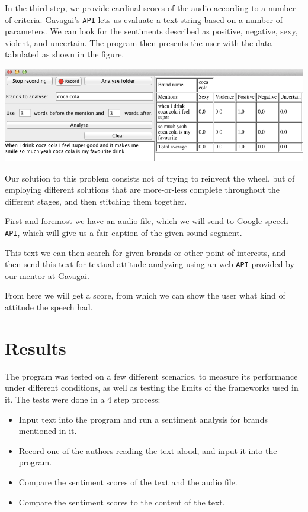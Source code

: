 \documentclass[a4paper,12pt,twoside]{ltxdoc}
\begin{document}
In the third step, we provide cardinal scores of the audio according to a number of criteria. Gavagai's \verb#API# lets us
evaluate a text string based on a number of parameters. We can look for the sentiments described as positive, negative, sexy, violent,
and uncertain. The program then presents the user with the data tabulated as shown in the figure. %

\begin{center}
\includegraphics[scale=0.6]{../poster/screenshot_crop.png}
\end{center}

Our solution to this problem consists not of trying to reinvent the wheel, but of employing different
solutions that are more-or-less complete throughout the different stages, and then stitching them together.

First and foremost we have an audio file, which we will send to Google speech \verb#API#, which will give us a fair caption of the given sound segment.

This text we can then search for given brands or other point of interests, and then send this text for textual attitude analyzing using an web \verb#API# provided by our mentor at Gavagai.

From here we will get a score, from which we can show the user what kind of attitude the speech had. 

\section{Results}
The program was tested on a few different scenarios, to measure its performance under different conditions, as well as testing the limits of the frameworks used in it. The tests were done in a 4 step process:

\begin{itemize}
\item Input text into the program and run a sentiment analysis for brands mentioned in it.
\item Record one of the authors reading the text aloud, and input it into the program.
\item Compare the sentiment scores of the text and the audio file.
\item Compare the sentiment scores to the content of the text.
\end{itemize}
\end{document}
